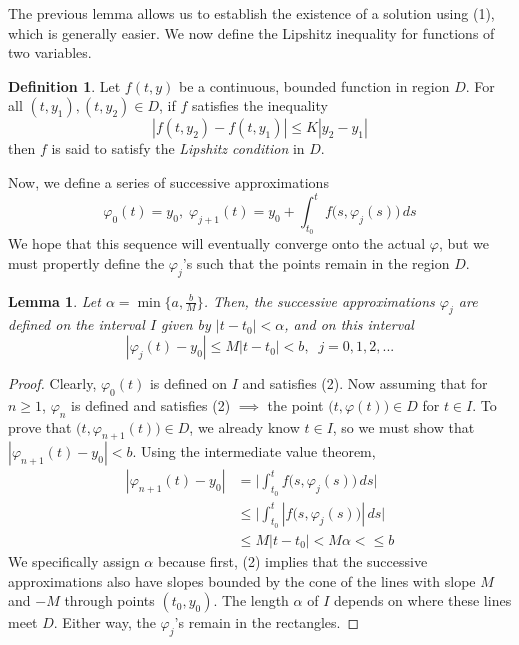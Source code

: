 \documentclass{article}
\newtheorem{lemma}[theorem]{Lemma}
\theoremstyle{remark}
\theoremstyle{definition}
\newtheorem{definition}{Definition}[section]
\begin{document}
The previous lemma allows us to establish the existence of a solution using (1), which is generally easier. We now define the Lipshitz inequality for functions of two variables. 

\begin{definition}
Let $f(t, y)$ be a continuous, bounded function in region $D$. For all $(t, y_1), (t, y_2) \in D$, if $f$ satisfies the inequality 
\[|f(t, y_2) - f(t, y_1)| \leq K |y_2 - y_1|\]
then $f$ is said to satisfy the \textit{Lipshitz condition} in $D$.
\end{definition}

Now, we define a series of successive approximations
\[\varphi_0 (t) = y_0, \; \varphi_{j+1} (t) = y_0 + \int_{t_0}^t f\big(s, \varphi_j (s) \big) \, ds\]
We hope that this sequence will eventually converge onto the actual $\varphi$, but we must propertly define the $\varphi_j$'s such that the points remain in the region $D$. 

\begin{lemma}
Let $\alpha = \min\{a, \frac{b}{M}\}$. Then, the successive approximations $\varphi_j$ are defined on the interval $I$ given by $|t - t_0| < \alpha$, and on this interval 
\begin{equation}
    |\varphi_j (t) - y_0| \leq M |t - t_0| < b, \;\; j = 0, 1, 2, ...
\end{equation}
\end{lemma}
\begin{proof}
Clearly, $\varphi_0 (t)$ is defined on $I$ and satisfies (2). Now assuming that for $n \geq 1$, $\varphi_n$ is defined and satisfies (2) $\implies$ the point $\big( t, \varphi(t)\big) \in D$ for $t \in I$. To prove that $\big(t, \varphi_{n+1}(t)\big) \in D$, we already know $t \in I$, so we must show that $|\varphi_{n+1} (t) - y_0| < b$. Using the intermediate value theorem,
\begin{align*}
    |\varphi_{n+1}(t) - y_0| & = \bigg| \int_{t_0}^t f\big(s, \varphi_j(s)\big) \, ds \bigg| \\
    & \leq \bigg| \int_{t_0}^t |f\big(s, \varphi_j (s)\big)|\, ds\bigg| \\
    & \leq M |t - t_0| < M\alpha < \leq b
\end{align*}
We specifically assign $\alpha$ because first, (2) implies that the successive approximations also have slopes bounded by the cone of the lines with slope $M$ and $-M$ through points $(t_0, y_0)$. The length $\alpha$ of $I$ depends on where these lines meet $D$. Either way, the $\varphi_j$'s remain in the rectangles.
\end{proof}
\end{document}
